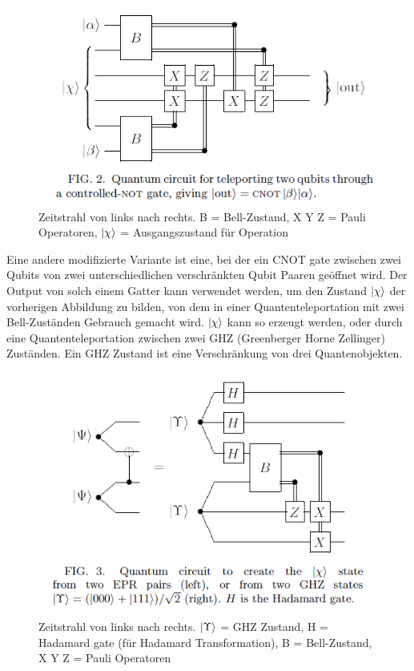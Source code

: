 \begin{figure}[h!]
    \centering
    \includegraphics[width=1.0\textwidth]{images/quantenteleportation_cnot_2.png}
    \caption{Zeitstrahl von links nach rechts. B = Bell-Zustand, X Y Z = Pauli Operatoren, \(\ket{\chi}\) = Ausgangszustand für Operation}
    \label{fig:meinbild}
\end{figure}
\newpage
\noindent Eine andere modifizierte Variante ist eine, bei der ein CNOT gate zwischen zwei Qubits von zwei unterschiedlichen verschränkten Qubit Paaren geöffnet wird. Der Output von solch einem Gatter kann verwendet werden, um den Zustand \(\ket{\chi}\) der vorherigen Abbildung zu bilden, von dem in einer Quantenteleportation mit zwei Bell-Zuständen Gebrauch gemacht wird. \(\ket{\chi}\) kann so erzeugt werden, oder durch eine Quantenteleportation zwischen zwei GHZ (Greenberger Horne Zellinger) Zuständen. Ein GHZ Zustand ist eine Verschränkung von drei Quantenobjekten.\\
\begin{figure}[h!]
    \centering
    \includegraphics[width=1.0\textwidth]{images/quantenteleportation_cnot_3.png}
    \caption{Zeitstrahl von links nach rechts. \(\ket{\Upsilon}\) = GHZ Zustand, H = Hadamard gate (für Hadamard Transformation), B = Bell-Zustand, X Y Z = Pauli Operatoren}
    \label{fig:meinbild}
\end{figure}
\newpage

